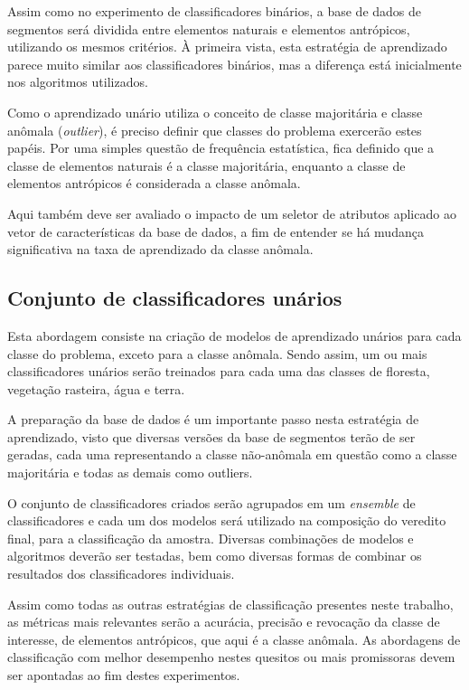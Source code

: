 Assim como no experimento de classificadores binários, a base de dados de segmentos será dividida entre elementos naturais e elementos antrópicos, utilizando os mesmos critérios. À primeira vista, esta estratégia de aprendizado parece muito similar aos classificadores binários, mas a diferença está inicialmente nos algoritmos utilizados.

Como o aprendizado unário utiliza o conceito de classe majoritária e classe anômala (\textit{outlier}), é preciso definir que classes do problema exercerão estes papéis. Por uma simples questão de frequência estatística, fica definido que a classe de elementos naturais é a classe majoritária, enquanto a classe de elementos antrópicos é considerada a classe anômala.

Aqui também deve ser avaliado o impacto de um seletor de atributos aplicado ao vetor de características da base de dados, a fim de entender se há mudança significativa na taxa de aprendizado da classe anômala.

\subsection{Conjunto de classificadores unários}

Esta abordagem consiste na criação de modelos de aprendizado unários para cada classe do problema, exceto para a classe anômala. Sendo assim, um ou mais classificadores unários serão treinados para cada uma das classes de floresta, vegetação rasteira, água e terra.

A preparação da base de dados é um importante passo nesta estratégia de aprendizado, visto que diversas versões da base de segmentos terão de ser geradas, cada uma representando a classe não-anômala em questão como a classe majoritária e todas as demais como outliers.

O conjunto de classificadores criados serão agrupados em um \textit{ensemble} de classificadores e cada um dos modelos será utilizado na composição do veredito final, para a classificação da amostra. Diversas combinações de modelos e algoritmos deverão ser testadas, bem como diversas formas de combinar os resultados dos classificadores individuais.

Assim como todas as outras estratégias de classificação presentes neste trabalho, as métricas mais relevantes serão a acurácia, precisão e revocação da classe de interesse, de elementos antrópicos, que aqui é a classe anômala. As abordagens de classificação com melhor desempenho nestes quesitos ou mais promissoras devem ser apontadas ao fim destes experimentos.

